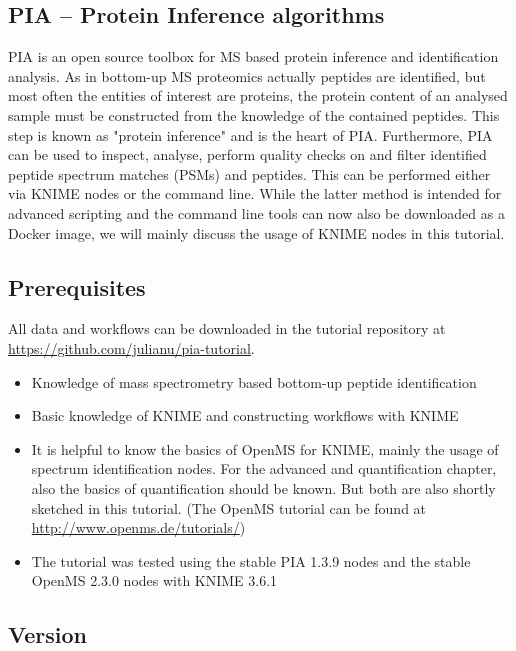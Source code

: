 \documentclass[a4paper,11pt,twoside]{article}
\begin{document}
\subsection{PIA -- Protein Inference algorithms}

PIA is an open source toolbox for MS based protein inference and identification
analysis. As in bottom-up MS proteomics actually peptides are identified, but
most often the entities of interest are proteins, the protein content of an
analysed sample must be constructed from the knowledge of the contained
peptides. This step is known as "protein inference" and is the heart of PIA.
Furthermore, PIA can be used to inspect, analyse, perform quality checks
on and filter identified peptide spectrum matches (PSMs) and peptides. This can
be performed either via KNIME nodes or the command line. While the latter
method is intended for advanced scripting and the command line tools can now
also be downloaded as a Docker image, we will mainly discuss the usage of KNIME
nodes in this tutorial.


\subsection{Prerequisites}

All data and workflows can be downloaded in the tutorial repository at\\
\url{https://github.com/julianu/pia-tutorial}.

\begin{itemize}
	\item Knowledge of mass spectrometry based bottom-up peptide identification
	\item Basic knowledge of KNIME and constructing workflows with KNIME

	\item It is helpful to know the basics of OpenMS for KNIME, mainly the usage
	of spectrum identification nodes. For the advanced and quantification chapter,
	also the basics of quantification should be known. But both are also shortly
	sketched in this tutorial. (The OpenMS tutorial can be found at
	\url{http://www.openms.de/tutorials/})

	\item The tutorial was tested using the stable PIA 1.3.9 nodes and the stable
	OpenMS 2.3.0 nodes with KNIME 3.6.1
\end{itemize}

\subsection{Version}
\end{document}
